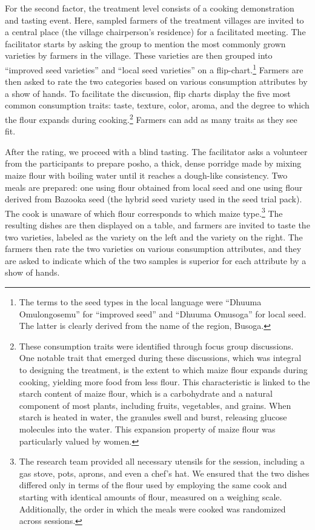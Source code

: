\documentclass[english]{article}\usepackage[]{graphicx}\usepackage[]{xcolor}
\begin{document}
For the second factor, the treatment level consists of a cooking demonstration
and tasting event. Here, sampled farmers of the treatment villages
are invited to a central place (the village chairperson's residence)
for a facilitated meeting. The facilitator starts by asking the group
to mention the most commonly grown varieties by farmers in the village.
These varieties are then grouped into ``improved seed varieties''
and ``local seed varieties'' on a flip-chart.\footnote{The terms to the seed types in the local language were ``Dhuuma Omulongosemu''
for ``improved seed'' and ``Dhuuma Omusoga'' for local seed. The
latter is clearly derived from the name of the region, Busoga.} Farmers are then asked to rate the two categories based on various
consumption attributes by a show of hands. To facilitate the discussion,
flip charts display the five most common consumption traits: taste,
texture, color, aroma, and the degree to which the flour expands during
cooking.\footnote{These consumption traits were identified through focus group discussions.
One notable trait that emerged during these discussions, which was
integral to designing the treatment, is the extent to which maize
flour expands during cooking, yielding \textquotedbl more food from
less flour.\textquotedbl{} This characteristic is linked to the starch
content of maize flour, which is a carbohydrate and a natural component
of most plants, including fruits, vegetables, and grains. When starch
is heated in water, the granules swell and burst, releasing glucose
molecules into the water. This expansion property of maize flour was
particularly valued by women.} Farmers can add as many traits as they see fit.

After the rating, we proceed with a blind tasting. The facilitator
asks a volunteer from the participants to prepare posho, a thick,
dense porridge made by mixing maize flour with boiling water until
it reaches a dough-like consistency. Two meals are prepared: one using
flour obtained from local seed and one using flour derived from Bazooka
seed (the hybrid seed variety used in the seed trial pack). The cook
is unaware of which flour corresponds to which maize type.\footnote{The research team provided all necessary utensils for the session,
including a gas stove, pots, aprons, and even a chef's hat. We ensured
that the two dishes differed only in terms of the flour used by employing
the same cook and starting with identical amounts of flour, measured
on a weighing scale. Additionally, the order in which the meals were
cooked was randomized across sessions.} The resulting dishes are then displayed on a table, and farmers are
invited to taste the two varieties, labeled as the variety on the
left and the variety on the right. The farmers then rate the two varieties
on various consumption attributes, and they are asked to indicate
which of the two samples is superior for each attribute by a show
of hands.
\end{document}
